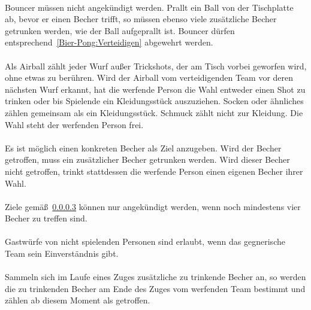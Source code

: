 \paragraph{}
\glqq{} Bouncer\grqq{} müssen nicht angekündigt werden.
Prallt ein Ball von der Tischplatte ab, bevor er einen Becher trifft, so müssen ebenso viele zusätzliche Becher getrunken werden, wie der Ball aufgeprallt ist.
Bouncer dürfen entsprechend~\ref{Bier-Pong:Verteidigen} abgewehrt werden.

\paragraph{}
Als \glqq{} Airball\grqq{} zählt jeder Wurf außer Trickshots, der am Tisch vorbei geworfen wird, ohne etwas zu berühren.
Wird der Airball vom verteidigenden Team vor deren nächsten Wurf erkannt, hat die werfende Person die Wahl entweder einen Shot zu trinken oder bis Spielende ein Kleidungsstück auszuziehen.
Socken oder ähnliches zählen gemeinsam als ein Kleidungsstück.
Schmuck zählt nicht zur Kleidung.
Die Wahl steht der werfenden Person frei.

\paragraph{}\label{Bier-Pong:Werfen:Ankündigen}
Es ist möglich einen konkreten Becher als Ziel anzugeben.
Wird der Becher getroffen, muss ein zusätzlicher Becher getrunken werden.
Wird dieser Becher nicht getroffen, trinkt stattdessen die werfende Person einen eigenen Becher ihrer Wahl.

\paragraph{}
Ziele gemäß~\ref{Bier-Pong:Werfen:Ankündigen} können nur angekündigt werden, wenn noch mindestens vier Becher zu treffen sind.

\paragraph{}
Gastwürfe von nicht spielenden Personen sind erlaubt, wenn das gegnerische Team sein Einverständnis gibt.

\paragraph{}
Sammeln sich im Laufe eines Zuges zusätzliche zu trinkende Becher an, so werden die zu trinkenden Becher am Ende des Zuges vom werfenden Team bestimmt und zählen ab diesem Moment als getroffen.

